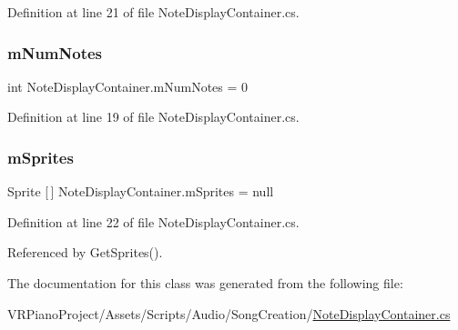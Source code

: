 Definition at line 21 of file Note\+Display\+Container.\+cs.

\mbox{\label{class_note_display_container_a31be4fc67033a1dcb210819e0e90d7e6}} 
\subsubsection{\texorpdfstring{m\+Num\+Notes}{mNumNotes}}
{\footnotesize\ttfamily int Note\+Display\+Container.\+m\+Num\+Notes = 0\hspace{0.3cm}{\ttfamily [private]}}



Definition at line 19 of file Note\+Display\+Container.\+cs.

\mbox{\label{class_note_display_container_a2816b590b588d86780ae622b3df403ee}} 
\subsubsection{\texorpdfstring{m\+Sprites}{mSprites}}
{\footnotesize\ttfamily Sprite \mbox{[}$\,$\mbox{]} Note\+Display\+Container.\+m\+Sprites = null\hspace{0.3cm}{\ttfamily [private]}}



Definition at line 22 of file Note\+Display\+Container.\+cs.



Referenced by Get\+Sprites().



The documentation for this class was generated from the following file\+:\begin{DoxyCompactItemize}
\item 
V\+R\+Piano\+Project/\+Assets/\+Scripts/\+Audio/\+Song\+Creation/\hyperlink{_note_display_container_8cs}{Note\+Display\+Container.\+cs}\end{DoxyCompactItemize}
